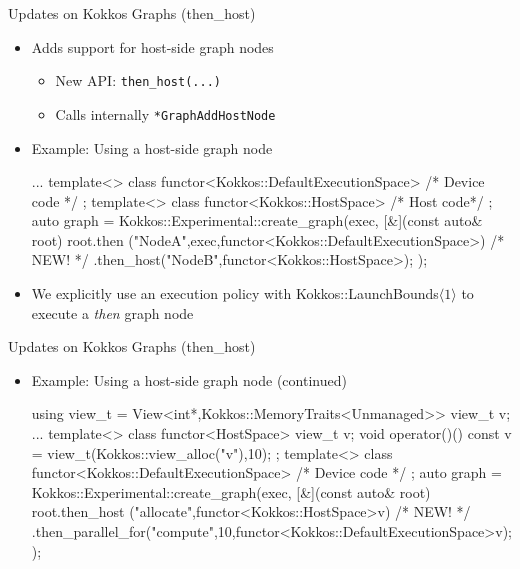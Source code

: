 
\begin{frame}[fragile]{Updates on Kokkos Graphs (then\_host)}
 \begin{itemize}
     \item Adds support for host-side graph nodes    
    \begin{itemize}
      \item New API: \texttt{then\_host(...)}
      \item Calls internally \texttt{*GraphAddHostNode}
    \end{itemize}
 \item Example: Using a host-side graph node
        \begin{code}[keywords={std}]
    ...
    template<>
    class functor<Kokkos::DefaultExecutionSpace>{ /* Device code */ };
    template<>
    class functor<Kokkos::HostSpace> { /* Host code*/ };
    auto graph = Kokkos::Experimental::create_graph(exec, 
        [&](const auto& root) {
          root.then ("NodeA",exec,functor<Kokkos::DefaultExecutionSpace>{})
          /* NEW! */
          .then_host("NodeB",functor<Kokkos::HostSpace>{});
    });      
      \end{code}
  
  \item We explicitly use an execution policy with Kokkos::LaunchBounds$\langle 1\rangle$ to execute a \emph{then} graph node
 \end{itemize}
\end{frame}



\begin{frame}[fragile]{Updates on Kokkos Graphs (then\_host)}
 \begin{itemize}
 \item Example: Using a host-side graph node (continued)
        \begin{code}[keywords={std}]
    using view_t = View<int*,Kokkos::MemoryTraits<Unmanaged>>
    view_t v;
    ...
    template<>
    class functor<HostSpace> {
      view_t v;
      void operator()() const { v = view_t(Kokkos::view_alloc("v"),10);}
    };
    template<>
    class functor<Kokkos::DefaultExecutionSpace>{ /* Device code */ };
    auto graph = Kokkos::Experimental::create_graph(exec, 
        [&](const auto& root) {
          root.then_host ("allocate",functor<Kokkos::HostSpace>{v})
          /* NEW! */
          .then_parallel_for("compute",10,functor<Kokkos::DefaultExecutionSpace>{v});
    });       
      \end{code}
 \end{itemize}
\end{frame}


